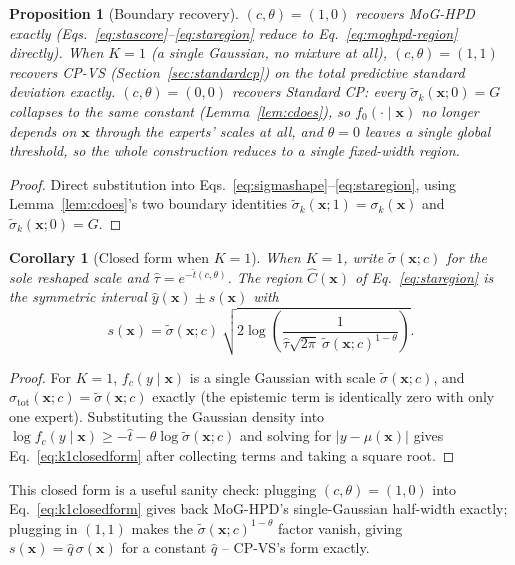 \documentclass[11pt]{article}
\newtheorem{proposition}{Proposition}[section]
\newtheorem{corollary}{Corollary}[section]
\begin{document}
\begin{proposition}[Boundary recovery]
\label{prop:starecovery}
$(c,\theta)=(1,0)$ recovers MoG-HPD exactly (Eqs.~\ref{eq:stascore}--\ref{eq:staregion} reduce to
Eq.~\ref{eq:moghpd-region} directly). When $K=1$ (a single Gaussian, no mixture at all),
$(c,\theta)=(1,1)$ recovers CP-VS (Section~\ref{sec:standardcp}) on the total predictive standard
deviation exactly. $(c,\theta)=(0,0)$ recovers Standard CP: every $\tilde\sigma_k(\bm x;0)=G$
collapses to the same constant (Lemma~\ref{lem:cdoes}), so $f_0(\cdot\mid\bm x)$ no longer depends
on $\bm x$ through the experts' scales at all, and $\theta=0$ leaves a single global threshold, so
the whole construction reduces to a single fixed-width region.
\end{proposition}
\begin{proof}
Direct substitution into Eqs.~\eqref{eq:sigmashape}--\eqref{eq:staregion}, using
Lemma~\ref{lem:cdoes}'s two boundary identities $\tilde\sigma_k(\bm x;1)=\sigma_k(\bm x)$ and
$\tilde\sigma_k(\bm x;0)=G$.
\end{proof}

\begin{corollary}[Closed form when $K=1$]
\label{cor:k1closedform}
When $K=1$, write $\tilde\sigma(\bm x;c)$ for the sole reshaped scale and $\hat\tau=e^{-\hat
t(c,\theta)}$. The region $\hat C(\bm x)$ of Eq.~\eqref{eq:staregion} is the symmetric interval
$\hat y(\bm x) \pm s(\bm x)$ with
\begin{equation}
s(\bm x) = \tilde\sigma(\bm x;c)\ \sqrt{2\log\!\left(\frac{1}{\hat\tau\sqrt{2\pi}\
\tilde\sigma(\bm x;c)^{1-\theta}}\right)}.
\label{eq:k1closedform}
\end{equation}
\end{corollary}
\begin{proof}
For $K=1$, $f_c(y\mid\bm x)$ is a single Gaussian with scale $\tilde\sigma(\bm x;c)$, and
$\sigma_{\mathrm{tot}}(\bm x;c)=\tilde\sigma(\bm x;c)$ exactly (the epistemic term is identically
zero with only one expert). Substituting the Gaussian density into $\log f_c(y\mid\bm x)\ge -\hat
t-\theta\log\tilde\sigma(\bm x;c)$ and solving for $|y-\mu(\bm x)|$ gives
Eq.~\eqref{eq:k1closedform} after collecting terms and taking a square root.
\end{proof}

This closed form is a useful sanity check: plugging $(c,\theta)=(1,0)$ into
Eq.~\eqref{eq:k1closedform} gives back MoG-HPD's single-Gaussian half-width exactly; plugging in
$(1,1)$ makes the $\tilde\sigma(\bm x;c)^{1-\theta}$ factor vanish, giving $s(\bm x) =
\hat q\,\sigma(\bm x)$ for a constant $\hat q$ -- CP-VS's form exactly.
\end{document}
